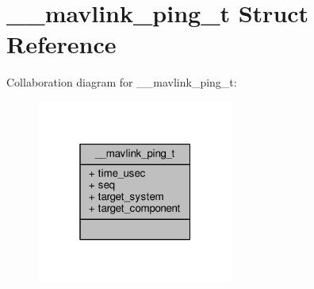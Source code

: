 \hypertarget{struct____mavlink__ping__t}{\section{\+\_\+\+\_\+mavlink\+\_\+ping\+\_\+t Struct Reference}
\label{struct____mavlink__ping__t}
}


Collaboration diagram for \+\_\+\+\_\+mavlink\+\_\+ping\+\_\+t\+:
\nopagebreak
\begin{figure}[H]
\begin{center}
\leavevmode
\includegraphics[width=184pt]{struct____mavlink__ping__t__coll__graph}
\end{center}
\end{figure}
